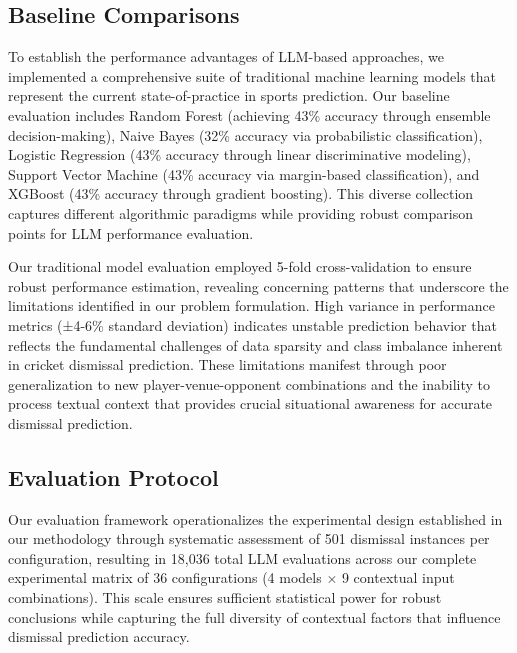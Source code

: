 \documentclass[sigconf,anonymous,review]{acmart}
\begin{document}
\subsection{Baseline Comparisons}
To establish the performance advantages of LLM-based approaches, we implemented a comprehensive suite of traditional machine learning models that represent the current state-of-practice in sports prediction. Our baseline evaluation includes Random Forest (achieving 43\% accuracy through ensemble decision-making), Naive Bayes (32\% accuracy via probabilistic classification), Logistic Regression (43\% accuracy through linear discriminative modeling), Support Vector Machine (43\% accuracy via margin-based classification), and XGBoost (43\% accuracy through gradient boosting). This diverse collection captures different algorithmic paradigms while providing robust comparison points for LLM performance evaluation.

Our traditional model evaluation employed 5-fold cross-validation to ensure robust performance estimation, revealing concerning patterns that underscore the limitations identified in our problem formulation. High variance in performance metrics (±4-6\% standard deviation) indicates unstable prediction behavior that reflects the fundamental challenges of data sparsity and class imbalance inherent in cricket dismissal prediction. These limitations manifest through poor generalization to new player-venue-opponent combinations and the inability to process textual context that provides crucial situational awareness for accurate dismissal prediction.


\subsection{Evaluation Protocol}

Our evaluation framework operationalizes the experimental design established in our methodology through systematic assessment of 501 dismissal instances per configuration, resulting in 18,036 total LLM evaluations across our complete experimental matrix of 36 configurations (4 models $\times$ 9 contextual input combinations). This scale ensures sufficient statistical power for robust conclusions while capturing the full diversity of contextual factors that influence dismissal prediction accuracy.
\end{document}
